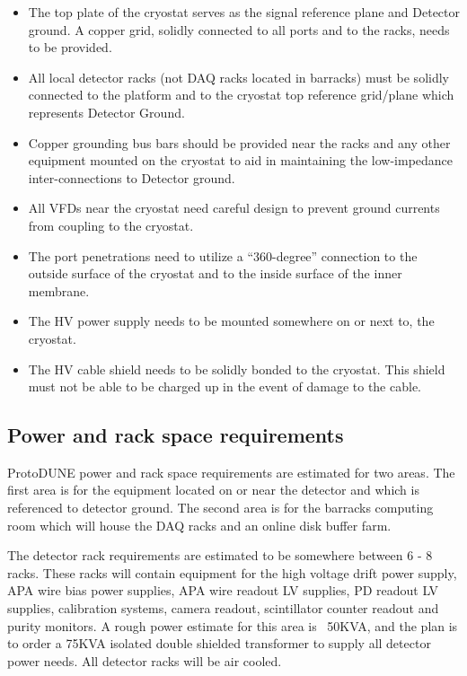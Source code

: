 \begin{itemize}
\item The top plate of the cryostat serves as the signal reference plane and Detector ground. A copper grid, solidly connected to all ports and to the racks, needs to be provided.
\item All local detector racks (not DAQ racks located in barracks) must be solidly connected to the platform and to the cryostat top reference grid/plane which represents Detector Ground.
\item Copper grounding bus bars should be provided near the racks and any other equipment mounted on the cryostat to aid in maintaining the low-impedance inter-connections to Detector ground.
\item All VFDs near the cryostat need careful design to prevent ground currents from coupling to the cryostat. 
\item The port penetrations need to utilize a “360-degree” connection to the outside surface of the cryostat and to the inside surface of the inner membrane.
\item The HV power supply needs to be mounted somewhere on or next to, the cryostat.
\item The HV cable shield needs to be solidly bonded to the cryostat. This shield must not be able to be charged up in the event of damage to the cable.
\end{itemize}

\subsection{Power and rack space requirements}

ProtoDUNE power and rack space requirements are estimated for two areas.  The first area is for the equipment located on or near the detector and which is referenced to detector ground.  The second area is for the barracks computing room which will house the DAQ racks and an online disk buffer farm.

The detector rack requirements are estimated to be somewhere between 6 - 8 racks.  These racks will contain equipment for the high voltage drift power supply, APA wire bias power supplies, APA wire readout LV supplies, PD readout LV supplies, calibration systems, camera readout, scintillator counter readout and purity monitors.  A rough power estimate for this area is ~50KVA, and the plan is to order a 75KVA isolated double shielded transformer to supply all detector power needs.  All detector racks will be air cooled.

